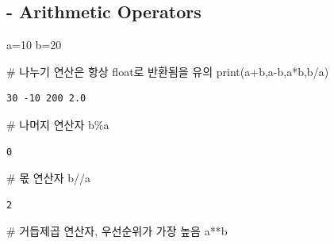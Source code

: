 \documentclass[
  letterpaper,
  DIV=11,
  numbers=noendperiod]{scrreprt}
\newenvironment{Shaded}{\begin{snugshade}}{\end{snugshade}}
\newcommand{\BuiltInTok}[1]{\textcolor[rgb]{0.00,0.23,0.31}{#1}}
\newcommand{\CommentTok}[1]{\textcolor[rgb]{0.37,0.37,0.37}{#1}}
\newcommand{\DecValTok}[1]{\textcolor[rgb]{0.68,0.00,0.00}{#1}}
\newcommand{\NormalTok}[1]{\textcolor[rgb]{0.00,0.23,0.31}{#1}}
\newcommand{\OperatorTok}[1]{\textcolor[rgb]{0.37,0.37,0.37}{#1}}
\begin{document}
\subsection{- Arithmetic Operators}\label{arithmetic-operators}

\begin{Shaded}
\begin{Highlighting}[]
\NormalTok{a}\OperatorTok{=}\DecValTok{10}
\NormalTok{b}\OperatorTok{=}\DecValTok{20}
\end{Highlighting}
\end{Shaded}

\begin{Shaded}
\begin{Highlighting}[]
\CommentTok{\# 나누기 연산은 항상 float로 반환됨을 유의}
\BuiltInTok{print}\NormalTok{(a}\OperatorTok{+}\NormalTok{b,a}\OperatorTok{{-}}\NormalTok{b,a}\OperatorTok{*}\NormalTok{b,b}\OperatorTok{/}\NormalTok{a)}
\end{Highlighting}
\end{Shaded}

\begin{verbatim}
30 -10 200 2.0
\end{verbatim}

\begin{Shaded}
\begin{Highlighting}[]
\CommentTok{\# 나머지 연산자}
\NormalTok{b}\OperatorTok{\%}\NormalTok{a}
\end{Highlighting}
\end{Shaded}

\begin{verbatim}
0
\end{verbatim}

\begin{Shaded}
\begin{Highlighting}[]
\CommentTok{\# 몫 연산자}
\NormalTok{b}\OperatorTok{//}\NormalTok{a}
\end{Highlighting}
\end{Shaded}

\begin{verbatim}
2
\end{verbatim}

\begin{Shaded}
\begin{Highlighting}[]
\CommentTok{\# 거듭제곱 연산자, 우선순위가 가장 높음}
\NormalTok{a}\OperatorTok{**}\NormalTok{b}
\end{Highlighting}
\end{Shaded}
\end{document}
